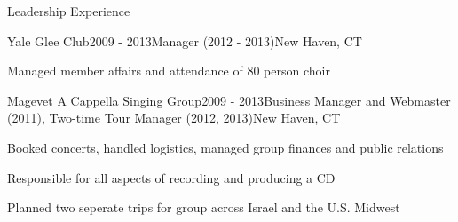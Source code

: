 \documentclass{resume} %
\begin{document}

\begin{rSection}{Leadership Experience}

\begin{rSubsection}{Yale Glee Club}{2009 - 2013}{Manager (2012 - 2013)}{New Haven, CT}
\item Managed member affairs and attendance of 80 person choir
\end{rSubsection}


\begin{rSubsection}{Magevet A Cappella Singing Group}{2009 - 2013}{Business Manager and Webmaster (2011), Two-time Tour Manager (2012, 2013)}{New Haven, CT}
\item Booked concerts, handled logistics, managed group finances and public relations
\item Responsible for all aspects of recording and producing a CD
\item Planned two seperate trips for group across Israel and the U.S. Midwest
\end{rSubsection}

\end{rSection}
\end{document}
